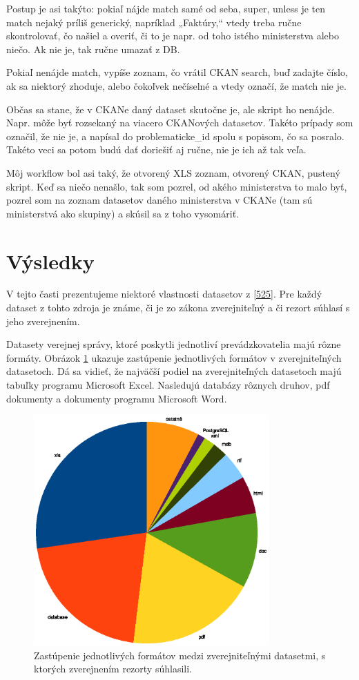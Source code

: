 \documentclass[12pt,a4paper]{article}
\begin{document}
Postup je asi takýto: pokiaľ nájde match samé od seba, super, unless je ten match nejaký príliš generický, napríklad „Faktúry,“ vtedy treba ručne skontrolovať, čo našiel a overiť, či to je napr. od toho istého ministerstva alebo niečo. Ak nie je, tak ručne umazať z DB.

Pokiaľ nenájde match, vypíše zoznam, čo vrátil CKAN search, buď zadajte číslo, ak sa niektorý zhoduje, alebo čokoľvek nečíselné a vtedy označí, že match nie je.

Občas sa stane, že v CKANe daný dataset skutočne je, ale skript ho nenájde. Napr. môže byť rozsekaný na viacero CKANových datasetov. Takéto prípady som označil, že nie je, a napísal do problematicke\_id spolu s popisom, čo sa posralo. Takéto veci sa potom budú dať doriešiť aj ručne, nie je ich až tak veľa.

Môj workflow bol asi taký, že otvorený XLS zoznam, otvorený CKAN, pustený skript. Keď sa niečo nenašlo, tak som pozrel, od akého ministerstva to malo byť, pozrel som na zoznam datasetov daného ministerstva v CKANe (tam sú ministerstvá ako skupiny) a skúsil sa z toho vysomáriť.


\section{Výsledky}

V tejto časti prezentujeme niektoré vlastnosti datasetov z \ref{525}. Pre každý dataset z tohto zdroja je známe, či je zo zákona zverejniteľný a či rezort súhlasí s jeho zverejnením.

Datasety verejnej správy, ktoré poskytli jednotliví prevádzkovatelia majú rôzne formáty. Obrázok \ref{formaty} ukazuje zastúpenie jednotlivých formátov v zverejniteľných datasetoch. Dá sa vidieť, že najväčší podiel na zverejniteľných datasetoch majú tabuľky programu Microsoft Excel. Nasledujú databázy rôznych druhov, pdf dokumenty a dokumenty programu Microsoft Word. 

\begin{figure}
\center \includegraphics[width=9cm]{dataset_formaty}
\caption{Zastúpenie jednotlivých formátov medzi zverejniteľnými datasetmi, s ktorých zverejnením rezorty súhlasili.}
\label{formaty}
\end{figure}
\end{document}
